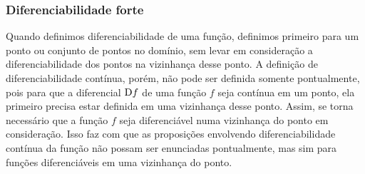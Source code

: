

\subsubsection{Diferenciabilidade forte}


Quando definimos diferenciabilidade de uma função, definimos primeiro para um ponto ou conjunto de pontos no domínio, sem levar em consideração a diferenciabilidade dos pontos na vizinhança desse ponto. A definição de diferenciabilidade contínua, porém, não pode ser definida somente pontualmente, pois para que a diferencial $\mathrm{D} f$ de uma função $f$ seja contínua em um ponto, ela primeiro precisa estar definida em uma vizinhança desse ponto. Assim, se torna necessário que a função $f$ seja diferenciável numa vizinhança do ponto em consideração. Isso faz com que as proposições envolvendo diferenciabilidade contínua da função não possam ser enunciadas pontualmente, mas sim para funções diferenciáveis em uma vizinhança do ponto.

